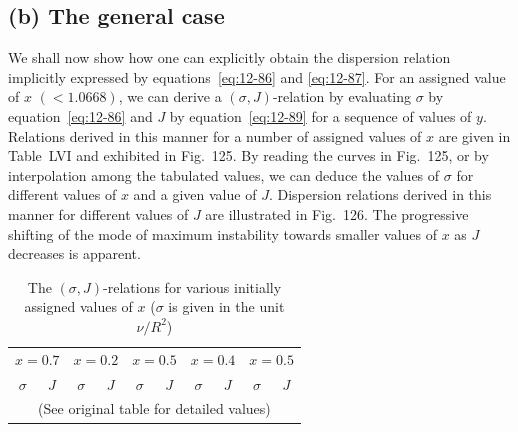 \subsection*{(b) The general case}

We shall now show how one can explicitly obtain the dispersion relation implicitly expressed by equations~\eqref{eq:12-86} and \eqref{eq:12-87}. For an assigned value of $x$ $(< 1.0668)$, we can derive a $(\sigma, J)$-relation by evaluating $\sigma$ by equation~\eqref{eq:12-86} and $J$ by equation~\eqref{eq:12-89} for a sequence of values of $y$. Relations derived in this manner for a number of assigned values of $x$ are given in Table~LVI and exhibited in Fig.~125. By reading the curves in Fig.~125, or by interpolation among the tabulated values, we can deduce the values of $\sigma$ for different values of $x$ and a given value of $J$. Dispersion relations derived in this manner for different values of $J$ are illustrated in Fig.~126. The progressive shifting of the mode of maximum instability towards smaller values of $x$ as $J$ decreases is apparent.

\begin{table}[ht]
\centering
\caption{The $(\sigma, J)$-relations for various initially assigned values of $x$ ($\sigma$ is given in the unit $\nu/R^2$)}
\label{tab:LVI}
\begin{tabular}{cccccccccc}
\hline
\multicolumn{2}{c}{$x=0.7$} & \multicolumn{2}{c}{$x=0.2$} & \multicolumn{2}{c}{$x=0.5$} & \multicolumn{2}{c}{$x=0.4$} & \multicolumn{2}{c}{$x=0.5$} \\
$\sigma$ & $J$ & $\sigma$ & $J$ & $\sigma$ & $J$ & $\sigma$ & $J$ & $\sigma$ & $J$ \\
\hline
\multicolumn{10}{c}{(See original table for detailed values)} \\
\hline
\end{tabular}
\end{table}



